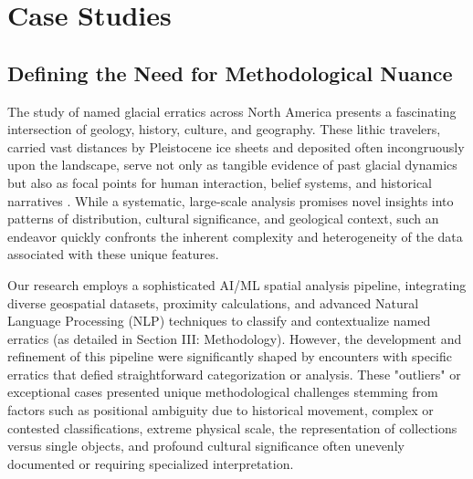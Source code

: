 \chapter{Case Studies}
\label{chapter:cases}

\section{Defining the Need for Methodological Nuance}
\label{sec:nuance}

The study of named glacial erratics across North America presents a fascinating intersection of geology, history, culture, and geography. These lithic travelers, carried vast distances by Pleistocene ice sheets and deposited often incongruously upon the landscape, serve not only as tangible evidence of past glacial dynamics but also as focal points for human interaction, belief systems, and historical narratives \cite{Flint1971, Benn2010}. While a systematic, large-scale analysis promises novel insights into patterns of distribution, cultural significance, and geological context, such an endeavor quickly confronts the inherent complexity and heterogeneity of the data associated with these unique features.

Our research employs a sophisticated AI/ML spatial analysis pipeline, integrating diverse geospatial datasets, proximity calculations, and advanced Natural Language Processing (NLP) techniques to classify and contextualize named erratics (as detailed in Section III: Methodology). However, the development and refinement of this pipeline were significantly shaped by encounters with specific erratics that defied straightforward categorization or analysis. These "outliers" or exceptional cases presented unique methodological challenges stemming from factors such as positional ambiguity due to historical movement, complex or contested classifications, extreme physical scale, the representation of collections versus single objects, and profound cultural significance often unevenly documented or requiring specialized interpretation.

